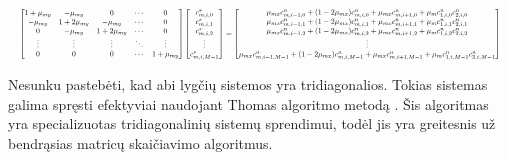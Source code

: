 \begin{align*}
  \resizebox{\textwidth}{!}{$
  \begin{bmatrix}
    1 + \mu_{my} & -\mu_{my} & 0 & \cdots & 0\\
    -\mu_{my} & 1 + 2\mu_{my} & -\mu_{my} & \cdots & 0\\
    0 & -\mu_{my} & 1 + 2\mu_{my} & \cdots & 0\\
    \vdots & \vdots & \vdots & \ddots & \vdots\\
    0 & 0 & 0 & \cdots & 1 + \mu_{my}
  \end{bmatrix}
  \begin{bmatrix}
    c^*_{m,i,0}\\
    c^*_{m,i,1}\\
    c^*_{m,i,2}\\
    \vdots\\
    c^*_{m,i,M-1}
  \end{bmatrix}
  =
  \begin{bmatrix}
    \mu_{mx}c^n_{m,i-1,0}+(1-2\mu_{mx})c^n_{m,i,0}+\mu_{mx}c^n_{m,i+1,0}+\mu_m c^n_{1,i,0}c^n_{2,i,0}\\
    \mu_{mx}c^n_{m,i-1,1}+(1-2\mu_{mx})c^n_{m,i,1}+\mu_{mx}c^n_{m,i+1,1}+\mu_m c^n_{1,i,1}c^n_{2,i,1}\\
    \mu_{mx}c^n_{m,i-1,2}+(1-2\mu_{mx})c^n_{m,i,2}+\mu_{mx}c^n_{m,i+1,2}+\mu_m c^n_{1,i,2}c^n_{2,i,2}\\
    \vdots\\
    \mu_{mx}c^n_{m,i-1,M-1}+(1-2\mu_{mx})c^n_{m,i,M-1}+\mu_{mx}c^n_{m,i+1,M-1}+\mu_m c^n_{1,i,M-1}c^n_{2,i,M-1}
  \end{bmatrix}
  $}
\end{align*}

Nesunku pastebėti, kad abi lygčių sistemos yra tridiagonalios. Tokias sistemas galima spręsti efektyviai naudojant Thomas algoritmo metodą \cite{doi:10.1137/S0036144591191280}. Šis algoritmas yra specializuotas tridiagonalinių sistemų sprendimui, todėl jis yra greitesnis už bendrąsias matricų skaičiavimo algoritmus.